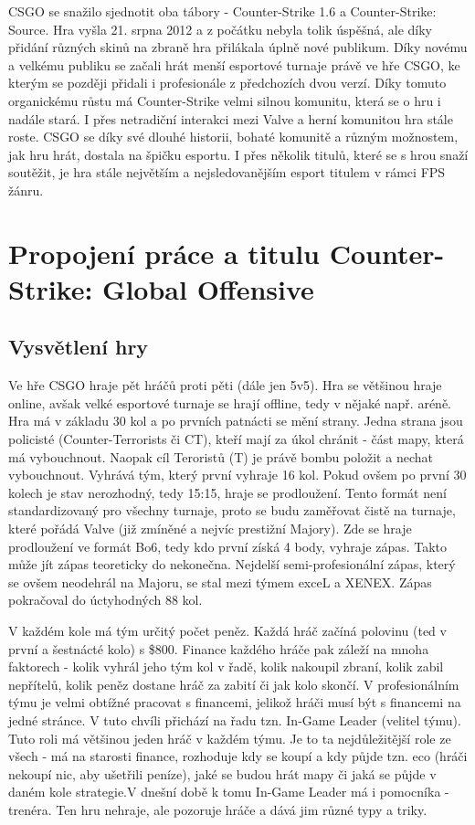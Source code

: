 \ac{CSGO} se snažilo sjednotit oba tábory - Counter-Strike 1.6 a Counter-Strike: Source. Hra vyšla 21. srpna 2012 a z počátku nebyla tolik úspěšná, ale díky přidání různých
skinů\cite{Valve2013} na zbraně hra přilákala úplně nové publikum. Díky novému a velkému publiku se začali hrát menší esportové turnaje právě ve hře \ac{CSGO}, ke kterým se
později přidali i profesionále z předchozích dvou verzí. Díky tomuto organickému růstu má Counter-Strike velmi silnou komunitu, která se o hru i nadále stará. I přes
netradiční interakci mezi Valve a herní komunitou hra stále roste. \ac{CSGO} se díky své dlouhé historii, bohaté komunitě a různým možnostem, jak hru hrát, dostala na špičku
esportu. I přes několik titulů, které se s hrou snaží soutěžit, je hra stále největším a nejsledovanějším esport titulem v rámci \ac{FPS} žánru\cite{Henningson2020}.

\section{Propojení práce a titulu Counter-Strike: Global Offensive}
\subsection{Vysvětlení hry}
Ve hře \ac{CSGO} hraje pět hráčů proti pěti (dále jen 5v5). Hra se většinou hraje online, avšak velké esportové turnaje se hrají offline, tedy v nějaké např. aréně.
Hra má v základu 30 kol a po  prvních patnácti se mění strany. Jedna strana jsou policisté (Counter-Terrorists či CT), kteří mají za úkol chránit  - část mapy,
která má vybouchnout. Naopak cíl Teroristů (T) je právě bombu položit a  nechat vybouchnout. Vyhrává tým, který první vyhraje 16 kol. Pokud ovšem po první 30 kolech
je stav nerozhodný, tedy 15:15, hraje se prodloužení. Tento formát není standardizovaný pro všechny turnaje, proto se budu zaměřovat čistě na turnaje,
které pořádá Valve (již zmíněné a nejvíc prestižní Majory). Zde se hraje prodloužení ve formát Bo6, tedy kdo první získá 4 body, vyhraje zápas. Takto může jít zápas teoreticky
do nekonečna. Nejdelší semi-profesionální zápas, který se ovšem neodehrál na Majoru, se stal mezi týmem exceL a XENEX\cite{hltv.org2015}. Zápas pokračoval do úctyhodných 88 kol.

V každém kole má tým určitý počet peněz. Každá hráč začíná polovinu (ted v první a šestnácté kolo) s \$800. Finance každého hráče pak záleží na mnoha
faktorech - kolik vyhrál jeho tým kol v řadě, kolik nakoupil zbraní, kolik zabil nepřítelů, kolik peněz dostane hráč za zabití či jak kolo skončí. V profesionálním týmu je
velmi obtížné pracovat s financemi, jelikož hráči musí být s financemi na jedné stránce. V tuto chvíli přichází na řadu tzn. In-Game Leader (velitel týmu). Tuto roli má většinou
jeden hráč v každém týmu. Je to ta nejdůležitější role ze všech - má na starosti finance, rozhoduje kdy se koupí a kdy půjde tzn. eco (hráči nekoupí nic, aby ušetřili peníze),
jaké se budou hrát mapy či jaká se půjde v daném kole strategie.V dnešní době k tomu In-Game Leader má i pomocníka - trenéra. Ten hru nehraje, ale pozoruje hráče a dává jim
různé typy a triky.

